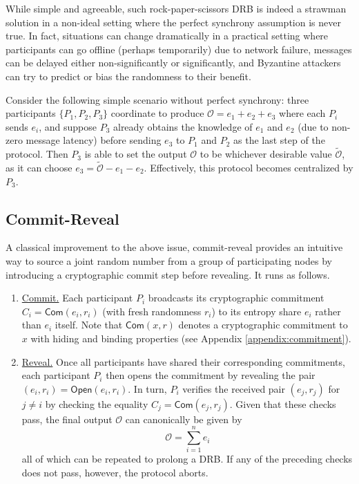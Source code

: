 \documentclass[letterpaper,twocolumn,10pt]{article}
\theoremstyle{definition}
\theoremstyle{remark}
\begin{document}
While simple and agreeable, such rock-paper-scissors DRB is indeed a strawman solution in a non-ideal setting where the perfect synchrony assumption is never true. In fact, situations can change dramatically in a practical setting where participants can go offline (perhaps temporarily) due to network failure, messages can be delayed either non-significantly or significantly, and Byzantine attackers can try to predict or bias the randomness to their benefit.

Consider the following simple scenario without perfect synchrony: three participants $\{P_1, P_2, P_3\}$ coordinate to produce $\mathcal{O} = e_1 + e_2 + e_3$ where each $P_i$ sends $e_i$, and suppose $P_3$ already obtains the knowledge of $e_1$ and $e_2$ (due to non-zero message latency) before sending $e_3$ to $P_1$ and $P_2$ as the last step of the protocol. Then $P_3$ is able to set the output $\mathcal{O}$ to be whichever desirable value $\widetilde{\mathcal{O}}$, as it can choose $e_3 = \widetilde{\mathcal{O}} - e_1 - e_2$. Effectively, this protocol becomes centralized by $P_3$.

\subsection{Commit-Reveal}
\label{subsection:commit-reveal}
A classical improvement to the above issue, commit-reveal provides an intuitive way to source a joint random number from a group of participating nodes by introducing a cryptographic commit step before revealing. It runs as follows.
\begin{enumerate}
\item \underline{Commit.} Each participant $P_i$ broadcasts its cryptographic commitment $C_i = \mathsf{Com}(e_i, r_i)$ (with fresh randomness $r_i$) to its entropy share $e_i$ rather than $e_i$ itself. Note that $\mathsf{Com}(x, r)$ denotes a cryptographic commitment to $x$ with hiding and binding properties (see Appendix \ref{appendix:commitment}).
\item \underline{Reveal.} Once all participants have shared their corresponding commitments, each participant $P_i$ then opens the commitment by revealing the pair $(e_i, r_i) = \mathsf{Open}(e_i, r_i)$. In turn, $P_i$ verifies the received pair $(e_j, r_j)$ for $j \neq i$ by checking the equality $C_j = \mathsf{Com}(e_j, r_j)$. Given that these checks pass, the final output $\mathcal{O}$ can canonically be given by
\[
\mathcal{O} = \sum_{i = 1}^n e_i
\]
all of which can be repeated to prolong a DRB. If any of the preceding checks does not pass, however, the protocol aborts.
\end{enumerate}
\end{document}
